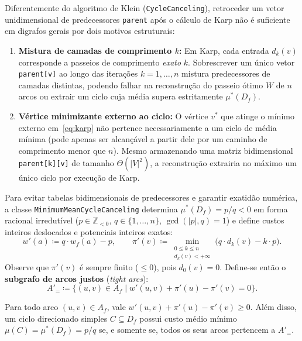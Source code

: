 Diferentemente do algoritmo de Klein (\lstinline{CycleCanceling}), retroceder um vetor unidimensional de predecessores \lstinline{parent} após o cálculo de Karp não é suficiente em digrafos gerais por dois motivos estruturais:
\begin{enumerate}
    \item \textbf{Mistura de camadas de comprimento $k$:} Em Karp, cada entrada $d_k(v)$ corresponde a passeios de comprimento \emph{exato} $k$. Sobrescrever um único vetor \lstinline{parent[v]} ao longo das iterações $k = 1, \dots, n$ mistura predecessores de camadas distintas, podendo falhar na reconstrução do passeio ótimo $W$ de $n$ arcos ou extrair um ciclo cuja média supera estritamente $\mu^*(D_f)$.
    \item \textbf{Vértice minimizante externo ao ciclo:} O vértice $v^*$ que atinge o mínimo externo em~\eqref{eq:karp} não pertence necessariamente a um ciclo de média mínima (pode apenas ser alcançável a partir dele por um caminho de comprimento menor que $n$). Mesmo armazenando uma matriz bidimensional \lstinline{parent[k][v]} de tamanho $\Theta(|V|^2)$, a reconstrução extrairia no máximo um único ciclo por execução de Karp.
\end{enumerate}

Para evitar tabelas bidimensionais de predecessores e garantir exatidão numérica, a classe \lstinline{MinimumMeanCycleCanceling} determina $\mu^*(D_f) = p / q < 0$ em forma racional irredutível ($p \in \mathbb{Z}_{<0}$, $q \in \{1, \dots, n\}$, $\gcd(|p|, q) = 1$) e define custos inteiros deslocados e potenciais inteiros exatos:
\begin{equation}
    w'(a) \coloneqq q \cdot w_f(a) - p, \qquad
    \pi'(v) \coloneqq \min_{\substack{0 \le k \le n \\ d_k(v) < +\infty}} \bigl(q \cdot d_k(v) - k \cdot p\bigr).
\end{equation}
Observe que $\pi'(v)$ é sempre finito ($\le 0$), pois $d_0(v) = 0$. Define-se então o \textbf{subgrafo de arcos justos} (\textit{tight arcs}):
\begin{equation}
    A'_= \coloneqq \bigl\{ (u,v) \in A_f \mid w'(u,v) + \pi'(u) - \pi'(v) = 0 \bigr\}.
\end{equation}

\begin{prop}\label{prop:arcos_justos}
Para todo arco $(u,v) \in A_f$, vale $w'(u,v) + \pi'(u) - \pi'(v) \ge 0$. Além disso, um ciclo direcionado simples $C \subseteq D_f$ possui custo médio mínimo $\mu(C) = \mu^*(D_f) = p/q$ se, e somente se, todos os seus arcos pertencem a $A'_=$.
\end{prop}

